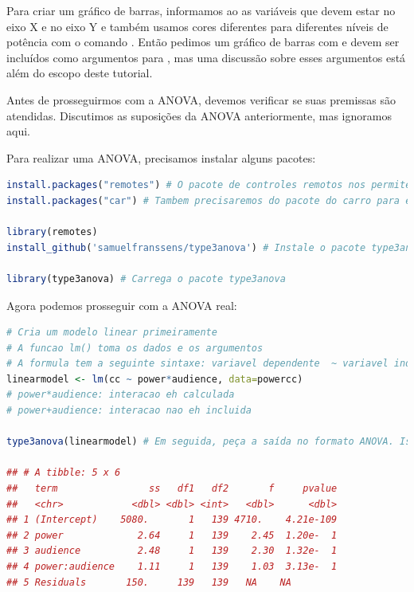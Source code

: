\documentclass{article}
\begin{document}
Para criar um gráfico de barras, informamos ao  as variáveis que devem estar no eixo X e no eixo Y e também usamos cores diferentes para diferentes níveis de potência com o comando . Então pedimos um gráfico de barras com  e  devem ser incluídos como argumentos para , mas uma discussão sobre esses argumentos está além do escopo deste tutorial.

Antes de prosseguirmos com a ANOVA, devemos verificar se suas premissas são atendidas. Discutimos as suposições da ANOVA anteriormente, mas ignoramos aqui.

Para realizar uma ANOVA, precisamos instalar alguns pacotes:

\begin{lstlisting}[language=R]
install.packages("remotes") # O pacote de controles remotos nos permite instalar pacotes armazenados no GitHub, um site para desenvolvedores de pacotes.
install.packages("car") # Tambem precisaremos do pacote do carro para executar a ANOVA (não é necessário reinstala-lo se você já tiver feito isso).

library(remotes)
install_github('samuelfranssens/type3anova') # Instale o pacote type3anova. Esta e as etapas anteriores precisam ser executadas apenas uma vez.

library(type3anova) # Carrega o pacote type3anova 
\end{lstlisting}

Agora podemos prosseguir com a ANOVA real:

\begin{lstlisting}[language=R]
# Cria um modelo linear primeiramente
# A funcao lm() toma os dados e os argumentos
# A formula tem a seguinte sintaxe: variavel dependente  ~ variavel independente
linearmodel <- lm(cc ~ power*audience, data=powercc) 
# power*audience: interacao eh calculada
# power+audience: interacao nao eh incluida

type3anova(linearmodel) # Em seguida, peça a saída no formato ANOVA. Isso fornece a soma dos quadrados do Tipo III. Observe que isso é diferente da anova (modelo linear), que fornece a soma dos quadrados do tipo I.

## # A tibble: 5 x 6
##   term                ss   df1   df2       f     pvalue
##   <chr>            <dbl> <dbl> <int>   <dbl>      <dbl>
## 1 (Intercept)    5080.       1   139 4710.    4.21e-109
## 2 power             2.64     1   139    2.45  1.20e-  1
## 3 audience          2.48     1   139    2.30  1.32e-  1
## 4 power:audience    1.11     1   139    1.03  3.13e-  1
## 5 Residuals       150.     139   139   NA    NA
\end{lstlisting}
\end{document}
